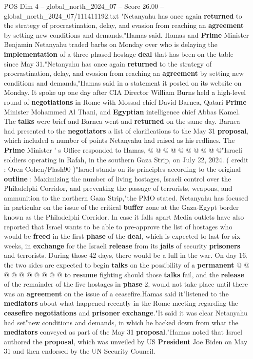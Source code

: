 \begin{textsample}{POS Dim 4 – global\_north\_2024\_07 – Score 26.00 – global\_north\_2024\_07/111411192.txt}  \label{ex:f4_pos_173}
"Netanyahu has once again \textbf{returned} to the strategy of procrastination, delay, and evasion from reaching an \textbf{agreement} by setting new conditions and demands,"Hamas said.
Hamas and \textbf{Prime} Minister Benjamin Netanyahu traded barbs on Monday over who is delaying the \textbf{implementation} of a three-phased hostage \textbf{deal} that has been on the table since May 31."Netanyahu has once again \textbf{returned} to the strategy of procrastination, delay, and evasion from reaching an \textbf{agreement} by setting new conditions and demands,"Hamas said in a statement it posted on its website on Monday.
It spoke up one day after CIA Director William Burns held a high-level round of \textbf{negotiations} in Rome with Mossad chief David Barnea, Qatari \textbf{Prime} Minister Mohammed Al Thani, and \textbf{Egyptian} intelligence chief Abbas Kamel.
The \textbf{talks} were brief and Barnea went and \textbf{returned} on the same day.
Barnea had presented to the \textbf{negotiators} a list of clarifications to the May 31 \textbf{proposal}, which included a number of points Netanyahu had raised as his redlines.
The \textbf{Prime} Minister ' s Office responded to Hamas, @ @ @ @ @ @ @ @ @ @"Israeli soldiers operating in Rafah, in the southern Gaza Strip, on July 22, 2024. ( credit : Oren Cohen/Flash90 )"Israel stands on its principles according to the original \textbf{outline} : Maximizing the number of living hostages, Israeli control over the Philadelphi Corridor, and preventing the passage of terrorists, weapons, and ammunition to the northern Gaza Strip,"the PMO stated.
Netanyahu has focused in particular on the issue of the critical \textbf{buffer} zone at the Gaza-Egypt border known as the Philadelphi Corridor.
In case it falls apart Media outlets have also reported that Israel wants to be able to pre-approve the list of hostages who would be \textbf{freed} in the first \textbf{phase} of the \textbf{deal}, which is expected to last for six weeks, in \textbf{exchange} for the Israeli \textbf{release} from its \textbf{jails} of security \textbf{prisoners} and terrorists.
During those 42 days, there would be a lull in the war.
On day 16, the two sides are expected to begin \textbf{talks} on the possibility of a \textbf{permanent} @ @ @ @ @ @ @ @ @ @ to \textbf{resume} fighting should those \textbf{talks} fail, and the \textbf{release} of the remainder of the live hostages in \textbf{phase} 2, would not take place until there was an \textbf{agreement} on the issue of a ceasefire.Hamas said it"listened to the \textbf{mediators} about what happened recently in the Rome meeting regarding the \textbf{ceasefire} \textbf{negotiations} and \textbf{prisoner} \textbf{exchange}."It said it was clear Netanyahu had set"new conditions and demands, in which he backed down from what the \textbf{mediators} conveyed as part of the May 31 \textbf{proposal}."Hamas noted that Israel authored the \textbf{proposal}, which was unveiled by US \textbf{President} Joe Biden on May 31 and then endorsed by the UN Security Council.

\end{textsample}
